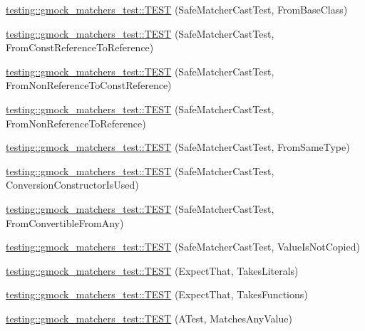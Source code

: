 \begin{DoxyCompactItemize}
\item 
\hyperlink{namespacetesting_1_1gmock__matchers__test_a937469149aee65efde526091af1e4f78}{testing\+::gmock\+\_\+matchers\+\_\+test\+::\+T\+E\+ST} (Safe\+Matcher\+Cast\+Test, From\+Base\+Class)
\item 
\hyperlink{namespacetesting_1_1gmock__matchers__test_a14ba7c67551222321056e4da6708010f}{testing\+::gmock\+\_\+matchers\+\_\+test\+::\+T\+E\+ST} (Safe\+Matcher\+Cast\+Test, From\+Const\+Reference\+To\+Reference)
\item 
\hyperlink{namespacetesting_1_1gmock__matchers__test_ad53741423311d4f76d9d980f59ec8d65}{testing\+::gmock\+\_\+matchers\+\_\+test\+::\+T\+E\+ST} (Safe\+Matcher\+Cast\+Test, From\+Non\+Reference\+To\+Const\+Reference)
\item 
\hyperlink{namespacetesting_1_1gmock__matchers__test_a362ce5b2b395dfd6363e4d80b49951f1}{testing\+::gmock\+\_\+matchers\+\_\+test\+::\+T\+E\+ST} (Safe\+Matcher\+Cast\+Test, From\+Non\+Reference\+To\+Reference)
\item 
\hyperlink{namespacetesting_1_1gmock__matchers__test_a9fc149b429176a45e45267132ae901bd}{testing\+::gmock\+\_\+matchers\+\_\+test\+::\+T\+E\+ST} (Safe\+Matcher\+Cast\+Test, From\+Same\+Type)
\item 
\hyperlink{namespacetesting_1_1gmock__matchers__test_aa608f074e26876d41333cd265c4ca008}{testing\+::gmock\+\_\+matchers\+\_\+test\+::\+T\+E\+ST} (Safe\+Matcher\+Cast\+Test, Conversion\+Constructor\+Is\+Used)
\item 
\hyperlink{namespacetesting_1_1gmock__matchers__test_a0490279eed67f8fa45f83c4951e1d8a1}{testing\+::gmock\+\_\+matchers\+\_\+test\+::\+T\+E\+ST} (Safe\+Matcher\+Cast\+Test, From\+Convertible\+From\+Any)
\item 
\hyperlink{namespacetesting_1_1gmock__matchers__test_ac82f8355af7a1e6ba3b67ba8423a1d73}{testing\+::gmock\+\_\+matchers\+\_\+test\+::\+T\+E\+ST} (Safe\+Matcher\+Cast\+Test, Value\+Is\+Not\+Copied)
\item 
\hyperlink{namespacetesting_1_1gmock__matchers__test_a7672c72f955b937542acd87d18dd7ea6}{testing\+::gmock\+\_\+matchers\+\_\+test\+::\+T\+E\+ST} (Expect\+That, Takes\+Literals)
\item 
\hyperlink{namespacetesting_1_1gmock__matchers__test_aafaf5273bd3d8ba273a5dd243d3a52ba}{testing\+::gmock\+\_\+matchers\+\_\+test\+::\+T\+E\+ST} (Expect\+That, Takes\+Functions)
\item 
\hyperlink{namespacetesting_1_1gmock__matchers__test_af15da53cdc65283b8ca688a03801fd12}{testing\+::gmock\+\_\+matchers\+\_\+test\+::\+T\+E\+ST} (A\+Test, Matches\+Any\+Value)

\end{DoxyCompactItemize}
